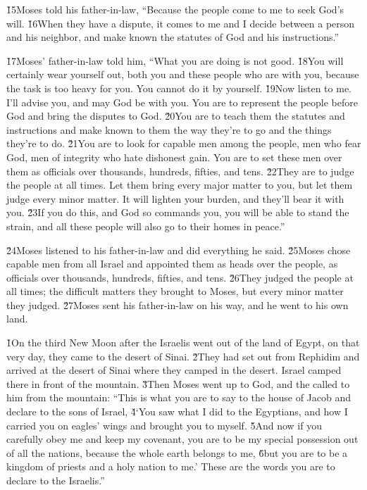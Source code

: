 \v{15}Moses told his father-in-law, ``Because the people come to me to seek God's will. \v{16}When they have a dispute, it comes to me and I decide between a person and his neighbor, and make known the statutes of God and his instructions.''

\v{17}Moses' father-in-law told him, ``What you are doing is not good. \v{18}You will certainly wear yourself out, both you and these people who are with you, because the task is too heavy for you. You cannot do it by yourself. \v{19}Now listen to me. I'll advise you, and may God be with you. You are to represent the people before God and bring the disputes to God. \v{20}You are to teach them the statutes and instructions and make known to them the way they're to go and the things they're to do. \v{21}You are to look for capable men among the people, men who fear God, men of integrity who hate dishonest gain. You are to set these men over them as officials over thousands, hundreds, fifties, and tens. \v{22}They are to judge the people at all times. Let them bring every major matter to you, but let them judge every minor matter. It will lighten your burden, and they'll bear it with you. \v{23}If you do this, and God so commands you, you will be able to stand the strain, and all these people will also go to their homes in peace.''

\v{24}Moses listened to his father-in-law and did everything he said. \v{25}Moses chose capable men from all Israel and appointed them as heads over the people, as officials over thousands, hundreds, fifties, and tens. \v{26}They judged the people at all times; the difficult matters they brought to Moses, but every minor matter they judged. \v{27}Moses sent his father-in-law on his way, and he went to his own land.

\v{1}On the third New Moon after the Israelis went out of the land of Egypt, on that very day, they came to the desert of Sinai. \v{2}They had set out from Rephidim and arrived at the desert of Sinai where they camped in the desert. Israel camped there in front of the mountain. \v{3}Then Moses went up to God, and the  called to him from the mountain: ``This is what you are to say to the house of Jacob and declare to the sons of Israel, \v{4}`You saw what I did to the Egyptians, and how I carried you on eagles' wings and brought you to myself. \v{5}And now if you carefully obey me and keep my covenant, you are to be my special possession out of all the nations, because the whole earth belongs to me, \v{6}but you are to be a kingdom of priests and a holy nation to me.' These are the words you are to declare to the Israelis.''

